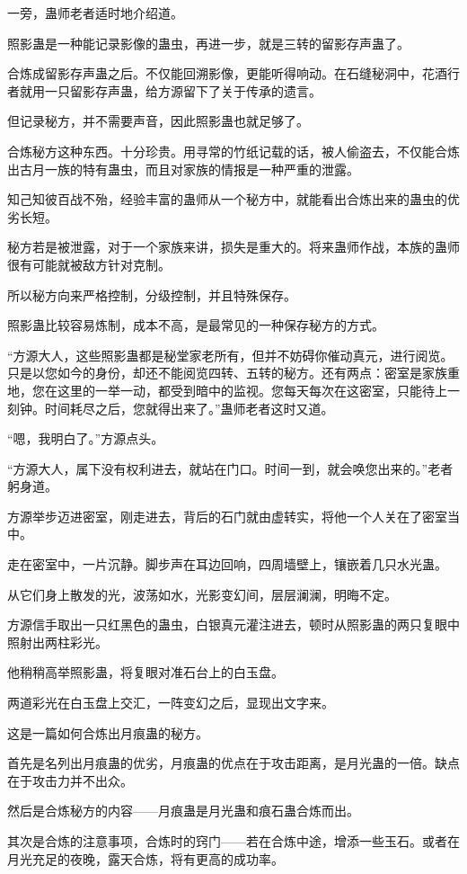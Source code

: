 \begin{this_body}
一旁，蛊师老者适时地介绍道。

照影蛊是一种能记录影像的蛊虫，再进一步，就是三转的留影存声蛊了。

合炼成留影存声蛊之后。不仅能回溯影像，更能听得响动。在石缝秘洞中，花酒行者就用一只留影存声蛊，给方源留下了关于传承的遗言。

但记录秘方，并不需要声音，因此照影蛊也就足够了。

合炼秘方这种东西。十分珍贵。用寻常的竹纸记载的话，被人偷盗去，不仅能合炼出古月一族的特有蛊虫，而且对家族的情报是一种严重的泄露。

知己知彼百战不殆，经验丰富的蛊师从一个秘方中，就能看出合炼出来的蛊虫的优劣长短。

秘方若是被泄露，对于一个家族来讲，损失是重大的。将来蛊师作战，本族的蛊师很有可能就被敌方针对克制。

所以秘方向来严格控制，分级控制，并且特殊保存。

照影蛊比较容易炼制，成本不高，是最常见的一种保存秘方的方式。

“方源大人，这些照影蛊都是秘堂家老所有，但并不妨碍你催动真元，进行阅览。只是以您如今的身份，却还不能阅览四转、五转的秘方。还有两点：密室是家族重地，您在这里的一举一动，都受到暗中的监视。您每天每次在这密室，只能待上一刻钟。时间耗尽之后，您就得出来了。”蛊师老者这时又道。

“嗯，我明白了。”方源点头。

“方源大人，属下没有权利进去，就站在门口。时间一到，就会唤您出来的。”老者躬身道。

方源举步迈进密室，刚走进去，背后的石门就由虚转实，将他一个人关在了密室当中。

走在密室中，一片沉静。脚步声在耳边回响，四周墙壁上，镶嵌着几只水光蛊。

从它们身上散发的光，波荡如水，光影变幻间，层层澜澜，明晦不定。

方源信手取出一只红黑色的蛊虫，白银真元灌注进去，顿时从照影蛊的两只复眼中照射出两柱彩光。

他稍稍高举照影蛊，将复眼对准石台上的白玉盘。

两道彩光在白玉盘上交汇，一阵变幻之后，显现出文字来。

这是一篇如何合炼出月痕蛊的秘方。

首先是名列出月痕蛊的优劣，月痕蛊的优点在于攻击距离，是月光蛊的一倍。缺点在于攻击力并不出众。

然后是合炼秘方的内容——月痕蛊是月光蛊和痕石蛊合炼而出。

其次是合炼的注意事项，合炼时的窍门——若在合炼中途，增添一些玉石。或者在月光充足的夜晚，露天合炼，将有更高的成功率。


\end{this_body}

